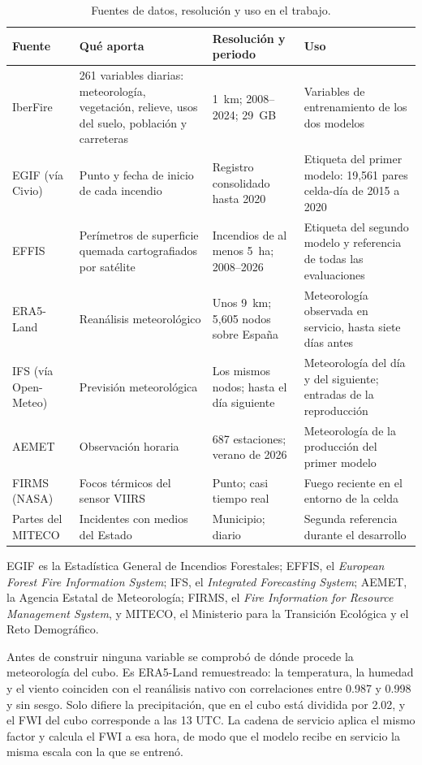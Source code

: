 \documentclass[10pt,a4paper]{article}
\begin{document}
\begin{table}[H]
  \centering
  \caption{Fuentes de datos, resolución y uso en el trabajo.}
  \label{tab:fuentes}
  \footnotesize
  \begin{tabular}{@{}>{\raggedright}p{2.5cm}>{\raggedright}p{4.9cm}>{\raggedright}p{3.6cm}>{\raggedright\arraybackslash}p{5.6cm}@{}}
    \toprule
    Fuente & Qué aporta & Resolución y periodo & Uso \\
    \midrule
    IberFire & 261 variables diarias: meteorología, vegetación, relieve, usos del suelo, población y carreteras & 1~km; 2008--2024; 29~GB & Variables de entrenamiento de los dos modelos \\
    EGIF (vía Civio) & Punto y fecha de inicio de cada incendio & Registro consolidado hasta 2020 & Etiqueta del primer modelo: 19,561 pares celda-día de 2015 a 2020 \\
    EFFIS & Perímetros de superficie quemada cartografiados por satélite & Incendios de al menos 5~ha; 2008--2026 & Etiqueta del segundo modelo y referencia de todas las evaluaciones \\
    ERA5-Land & Reanálisis meteorológico & Unos 9~km; 5,605 nodos sobre España & Meteorología observada en servicio, hasta siete días antes \\
    IFS (vía Open-Meteo) & Previsión meteorológica & Los mismos nodos; hasta el día siguiente & Meteorología del día y del siguiente; entradas de la reproducción \\
    AEMET & Observación horaria & 687 estaciones; verano de 2026 & Meteorología de la producción del primer modelo \\
    FIRMS (NASA) & Focos térmicos del sensor VIIRS & Punto; casi tiempo real & Fuego reciente en el entorno de la celda \\
    Partes del MITECO & Incidentes con medios del Estado & Municipio; diario & Segunda referencia durante el desarrollo \\
    \bottomrule
  \end{tabular}
\end{table}

EGIF es la Estadística General de Incendios Forestales; EFFIS, el
\emph{European Forest Fire Information System}; IFS, el \emph{Integrated
Forecasting System}; AEMET, la Agencia Estatal de Meteorología; FIRMS, el
\emph{Fire Information for Resource Management System}, y MITECO, el
Ministerio para la Transición Ecológica y el Reto Demográfico.

Antes de construir ninguna variable se comprobó de dónde procede la
meteorología del cubo. Es ERA5-Land remuestreado: la temperatura, la humedad y
el viento coinciden con el reanálisis nativo con correlaciones entre 0.987 y
0.998 y sin sesgo. Solo difiere la precipitación, que en el cubo está dividida
por 2.02, y el FWI del cubo corresponde a las 13 UTC. La cadena de servicio
aplica el mismo factor y calcula el FWI a esa hora, de modo que el modelo
recibe en servicio la misma escala con la que se entrenó.
\end{document}
